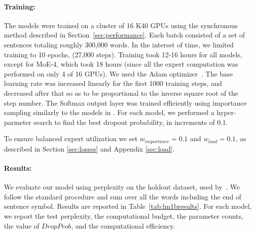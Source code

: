 \documentclass{article} %
\begin{document}
\paragraph{Training:} The models were trained on a cluster of 16 K40 GPUs using the synchronous method described in Section~\ref{sec:performance}.  Each batch consisted of a set of sentences totaling roughly 300,000 words.  In the interest of time, we limited training to 10 epochs, (27,000 steps).  Training took 12-16 hours for all models, except for MoE-4, which took 18 hours (since all the expert computation was performed on only 4 of 16 GPUs).  We used the Adam optimizer~\citep{kingma2014adam}. The base learning rate was increased linearly for the first 1000 training steps, and decreased after that so as to be proportional to the inverse square root of the step number.  The Softmax output layer was trained efficiently using importance sampling similarly to the models in \citep{RafalNoam16}.  For each model, we performed a hyper-parmeter search to find the best dropout probability, in increments of 0.1.

To ensure balanced expert utilization we set $w_{importance}=0.1$ and $w_{load}=0.1$, as described in Section \ref{sec:losses} and Appendix \ref{sec:load}.

\paragraph{Results:} We evaluate our model using perplexity on the holdout dataset, used by~\citep{chelba2013one,RafalNoam16}. We follow the standard procedure and sum over all the words including the end of sentence symbol.  Results are reported in Table~\ref{tab:lm1bresults}.   For each model, we report the test perplexity, the computational budget, the parameter counts, the value of $DropProb$, and the computational efficiency.
\end{document}

